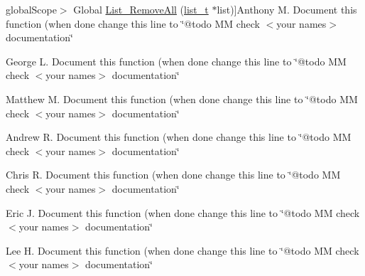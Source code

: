\begin{DoxyRefList}
\hypertarget{todo__todo000029}{}%
global\+Scope$>$ Global \hyperlink{group__list_ga9aa26203c61296e5fd884941aa98a2cd}{List\+\_\+\+Remove\+All} (\hyperlink{structlist__t}{list\+\_\+t} $\ast$list)]Anthony M. Document this function (when done change this line to \char`\"{}@todo M\+M check $<$your names$>$ documentation\char`\"{}  
\item[\label{todo__todo000026}%
\hypertarget{todo__todo000026}{}%
global\+Scope$>$ Global \hyperlink{group__list_gafae6d0ac526e5f6e3234953e57230cb7}{List\+\_\+\+Remove\+First} (\hyperlink{structlist__t}{list\+\_\+t} $\ast$list)]George L. Document this function (when done change this line to \char`\"{}@todo M\+M check $<$your names$>$ documentation\char`\"{}  
\item[\label{todo__todo000027}%
\hypertarget{todo__todo000027}{}%
global\+Scope$>$ Global \hyperlink{group__list_ga5c4eb0789125264dc26f77760586d46b}{List\+\_\+\+Remove\+Last} (\hyperlink{structlist__t}{list\+\_\+t} $\ast$list)]Matthew M. Document this function (when done change this line to \char`\"{}@todo M\+M check $<$your names$>$ documentation\char`\"{}  
\item[\label{todo__todo000019}%
\hypertarget{todo__todo000019}{}%
global\+Scope$>$ Global \hyperlink{group__list_ga36dab9276628d1025b55b1fb43a3d0d6}{List\+\_\+\+Resort\+First} (\hyperlink{structlist__t}{list\+\_\+t} $\ast$list)]Andrew R. Document this function (when done change this line to \char`\"{}@todo M\+M check $<$your names$>$ documentation\char`\"{}  
\item[\label{todo__todo000020}%
\hypertarget{todo__todo000020}{}%
global\+Scope$>$ Global \hyperlink{group__list_ga616d771c42c25750ea9b4c14c4df8c9c}{List\+\_\+\+Resort\+Last} (\hyperlink{structlist__t}{list\+\_\+t} $\ast$list)]Chris R. Document this function (when done change this line to \char`\"{}@todo M\+M check $<$your names$>$ documentation\char`\"{}  
\item[\label{todo__todo000015}%
\hypertarget{todo__todo000015}{}%
global\+Scope$>$ Global \hyperlink{group__list_ga41266aadaf8ad04a1bf043637bb6eb86}{List\+\_\+\+Set\+Identify\+Function} (\hyperlink{structlist__t}{list\+\_\+t} $\ast$list, uint8\+\_\+t($\ast$identify\+\_\+fn)(void $\ast$identifier, void $\ast$item))]Eric J. Document this function (when done change this line to \char`\"{}@todo M\+M check $<$your names$>$ documentation\char`\"{}  
\item[\label{todo__todo000014}%
\hypertarget{todo__todo000014}{}%
global\+Scope$>$ Global \hyperlink{group__list_ga61c9a347e890a26159c3fa0cb567ae68}{List\+\_\+\+Set\+Sort\+Function} (\hyperlink{structlist__t}{list\+\_\+t} $\ast$list, uint8\+\_\+t($\ast$sort\+\_\+fn)(void $\ast$a, void $\ast$b))]Lee H. Document this function (when done change this line to \char`\"{}@todo M\+M check $<$your names$>$ documentation\char`\"{}  

\end{DoxyRefList}
